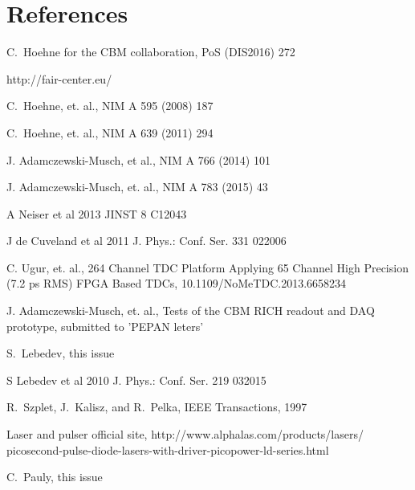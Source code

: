 \documentclass[final,5p,times,twocolumn]{elsarticle}
\begin{document}
\section*{References}

\begin{thebibliography}{99}

C.~Hoehne for the CBM collaboration,
PoS (DIS2016) 272

http://fair-center.eu/

C.~Hoehne, et. al.,
NIM A 595 (2008) 187

C.~Hoehne, et. al.,
NIM A 639 (2011) 294

J. Adamczewski-Musch, et al.,
NIM A 766 (2014) 101

J. Adamczewski-Musch, et. al.,
NIM A 783 (2015) 43

A Neiser et al 2013 JINST 8 C12043

J de Cuveland et al 2011 J. Phys.: Conf. Ser. 331 022006

C. Ugur, et. al.,
264 Channel TDC Platform Applying 65 Channel High Precision (7.2 ps RMS) FPGA Based TDCs,
10.1109/NoMeTDC.2013.6658234

J. Adamczewski-Musch, et. al.,
Tests of the CBM RICH readout and DAQ prototype,
submitted to 'PEPAN leters'

S.~Lebedev,
this issue

S Lebedev et al 2010 J. Phys.: Conf. Ser. 219 032015 

R.~Szplet, J.~Kalisz, and R.~Pelka,
IEEE Transactions, 1997

Laser and pulser official site,
http://www.alphalas.com/products/lasers/ picosecond-pulse-diode-lasers-with-driver-picopower-ld-series.html

C.~Pauly,
this issue

\end{thebibliography}

\end{document}
